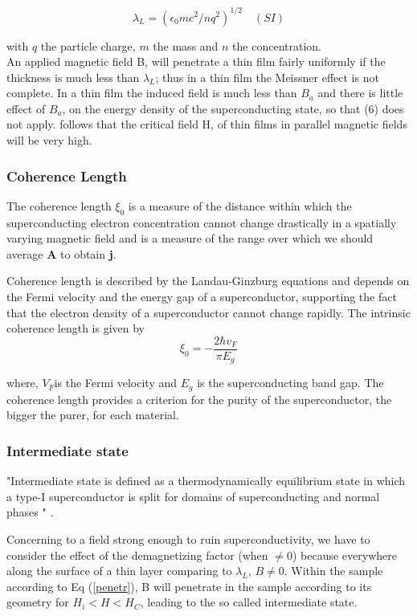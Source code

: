 \documentclass[openany,11pt,a4paper]{report}
\begin{document}
\begin{equation}
\lambda_{L}=\left(\epsilon_{0} m c^{2} / n q^{2}\right)^{1 / 2} \quad (SI)
\end{equation}

with $q$ the particle charge, $m$ the mass and $n$ the concentration.\\

An applied magnetic field B, will penetrate a thin film fairly uniformly if
the thickness is much less than $\lambda_{L}$; thus in a thin film the Meissner effect is not
complete. In a thin film the induced field is much less than $B_{a}$ and there is
little effect of $B_{a}$, on the energy density of the superconducting state, so that
(6) does not apply. follows that the critical field H, of thin films in parallel
magnetic fields will be very high.

\subsubsection{Coherence Length}
The coherence length  $\xi_{0}$ is a measure of the distance within which the superconducting electron concentration cannot change drastically in a spatially varying magnetic field and is a measure of the range over
which we should average \textbf{A} to obtain \textbf{j}.


Coherence length is described by the Landau-Ginzburg equations and depends on the Fermi velocity and the energy gap of a superconductor, supporting the fact that the electron density of a superconductor cannot change rapidly. The intrinsic coherence length is given by
\begin{equation}
\xi_{0}=-\frac{2 \hbar v_{F}}{\pi E_{g}}
\end{equation} 

where, $V_{F}$is the Fermi velocity and $E_{g}$ is the superconducting band gap. The coherence length provides a criterion for the purity of the superconductor, the bigger the purer, for each material.
 
\subsubsection{Intermediate state}

"Intermediate state is defined as a thermodynamically equilibrium state in which a type-I
superconductor is split for domains of superconducting and normal phases " \cite{intermediate}.


Concerning to a field strong enough to ruin superconductivity, we have to consider the effect of the demagnetizing factor (when $\neq0$) because everywhere along the surface of a thin layer comparing to $\lambda _{L}$, $B\neq0$. Within the sample according to Eq (\ref{penetr}), B will penetrate in the sample according to its geometry for $H_{i}<H<H_{C}$, leading to the so called intermediate state.
\end{document}
